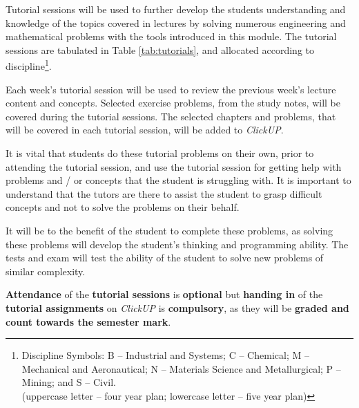         Tutorial sessions will be used to further develop the students
        understanding and knowledge of the topics covered in lectures
        by solving numerous engineering and mathematical problems with
        the tools introduced in this module. The tutorial sessions are
        tabulated in Table \ref{tab:tutorials}, and allocated
        according to discipline\footnote{Discipline Symbols:
            B -- Industrial and Systems;
            C -- Chemical;
            M -- Mechanical and Aeronautical;
            N -- Materials Science and Metallurgical;
            P -- Mining; and
            S -- Civil. \\
            (uppercase letter -- four year plan;
            lowercase letter -- five year plan)}.

        Each week's tutorial session will be used to review the
        previous week's lecture content and concepts. Selected
        exercise problems, from the study notes, will be covered
        during the tutorial sessions. The selected chapters and
        problems, that will be covered in each tutorial session, will
        be added to {\it ClickUP}.

        It is vital that students do these tutorial problems on their own,
        prior to attending the tutorial session, and use the tutorial session
        for getting help with problems and / or concepts that the student is
        struggling with. It is important to understand that the tutors are
        there to assist the student to grasp difficult concepts and not to
        solve the problems on their behalf.

        It will be to the benefit of the student to complete these
        problems, as solving these problems will develop the student's
        thinking and programming ability. The tests and exam will
        test the ability of the student to solve new problems of
        similar complexity.

        \textbf{Attendance} of the \textbf{tutorial sessions}
        is \textbf{optional} but \textbf{handing in} of the
        \textbf{tutorial assignments} on {\it ClickUP} is
        \textbf{compulsory}, as they will be \textbf{graded and count
        towards the semester mark}.
